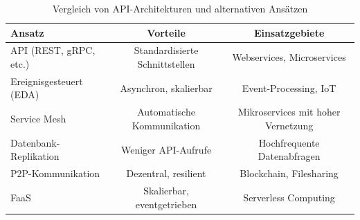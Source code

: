 \documentclass[../vs-script-first-v01.tex]{subfiles}
\begin{document}
\begin{table}[h]
    \centering
    \begin{tabular}{|l|c|c|}
        \hline
        \textbf{Ansatz} & \textbf{Vorteile} & \textbf{Einsatzgebiete} \\
        \hline
        API (REST, gRPC, etc.) & Standardisierte Schnittstellen & Webservices, Microservices \\
        Ereignisgesteuert (EDA) & Asynchron, skalierbar & Event-Processing, IoT \\
        Service Mesh & Automatische Kommunikation & Mikroservices mit hoher Vernetzung \\
        Datenbank-Replikation & Weniger API-Aufrufe & Hochfrequente Datenabfragen \\
        P2P-Kommunikation & Dezentral, resilient & Blockchain, Filesharing \\
        FaaS & Skalierbar, eventgetrieben & Serverless Computing \\
        \hline
    \end{tabular}
    \caption{Vergleich von API-Architekturen und alternativen Ansätzen}
    \label{tab:vergleich}
\end{table}
\end{document}
